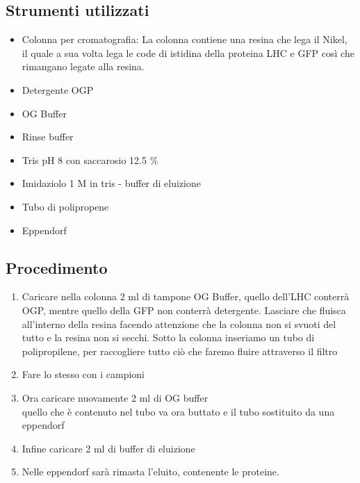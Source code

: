 \documentclass{extarticle}
\begin{document}
\subsection*{Strumenti utilizzati}
\begin{minipage}{0.40 \textwidth}
    \begin{itemize}
        \item Colonna per cromatografia: La colonna contiene una resina che lega il Nikel, il quale a sua volta lega le code
        di istidina della proteina LHC e GFP così che rimangano legate alla resina.
        \item Detergente OGP
        \item OG Buffer
        \item Rinse buffer
        \item Tris pH 8 con saccarosio 12.5 $\%$
        \item Imidaziolo 1 M in tris - buffer di eluizione
        \item Tubo di polipropene
        \item Eppendorf
    \end{itemize}
\end{minipage} \hfill
\begin{minipage}{0.50 \textwidth}
    \subsection*{Procedimento}
    \begin{enumerate}
        \item Caricare nella colonna 2 ml di tampone OG Buffer, quello dell'LHC conterrà OGP, mentre quello della GFP non conterrà detergente. Lasciare che fluisca all'interno della resina facendo attenzione che la colonna non si svuoti del
        tutto e la resina non si secchi. Sotto la colonna inseriamo un tubo di polipropilene, per raccogliere tutto ciò che faremo fluire attraverso il filtro
        \item Fare lo stesso con i campioni
        \item Ora caricare nuovamente 2 ml di OG buffer\\
        quello che è contenuto nel tubo va ora buttato e il tubo sostituito da una eppendorf
        \item Infine caricare 2 ml di buffer di eluizione
        \item Nelle eppendorf sarà rimasta l'eluito, contenente le proteine.
    \end{enumerate}
\end{minipage}
\newpage
\end{document}
